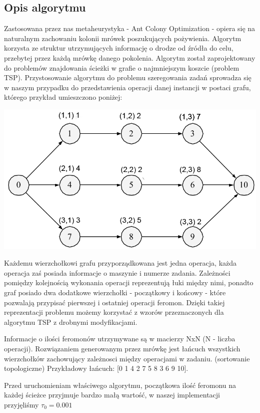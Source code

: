 \documentclass[10pt,a4paper]{article}
\begin{document}
\subsection{Opis algorytmu}
Zastosowana przez nas metaheurystyka - Ant Colony Optimization - opiera się na
naturalnym zachowaniu kolonii mrówek poszukujących pożywienia. Algorytm korzysta
ze struktur utrzymujących informację o drodze od źródła do celu, przebytej przez
każdą mrówkę danego pokolenia. Algorytm został zaprojektowany do problemów
znajdowania ścieżki w grafie o najmniejszym koszcie (problem TSP).
Przystosowanie algorytmu do problemu szeregowania zadań sprowadza się w naszym
przypadku do przedstawienia operacji danej instancji w postaci grafu, którego
przykład umieszczono poniżej:\\
\begin{center}
    \includegraphics[scale=0.4]{./figures/pic01.png}\\
\end{center}
Każdemu wierzchołkowi grafu przyporządkowana jest jedna operacja, każda
operacja zaś posiada informacje o maszynie i numerze zadania.  Zależności
pomiędzy kolejnością wykonania operacji reprezentują łuki między nimi, ponadto
graf posiado dwa dodatkowe wierzchołki - początkowy i końcowy - które pozwalają
przypisać pierwszej i ostatniej operacji feromon. Dzięki takiej reprezentacji
problemu możemy korzystać z wzorów przeznaczonych dla algorytmu TSP z drobnymi
modyfikacjami.

Informacje o ilości feromonów utrzymywane są w macierzy NxN (N - liczba
operacji).  Rozwiązaniem generowanym przez mrówkę jest łańcuch wszystkich
wierzchołków zachowujący zależnosci między operacjami w zadaniu.  (sortowanie
topologiczne) Przykładowy łańcuch: [0 1 4 2 7 5 8 3 6 9 10].

Przed uruchomieniam właściwego algorytmu, początkowa ilość feromonu na każdej
ścieżce przyjmuje bardzo małą wartość, w naszej implementacji przyjęliśmy $
\tau_0 = 0.001 $ 
\end{document}
